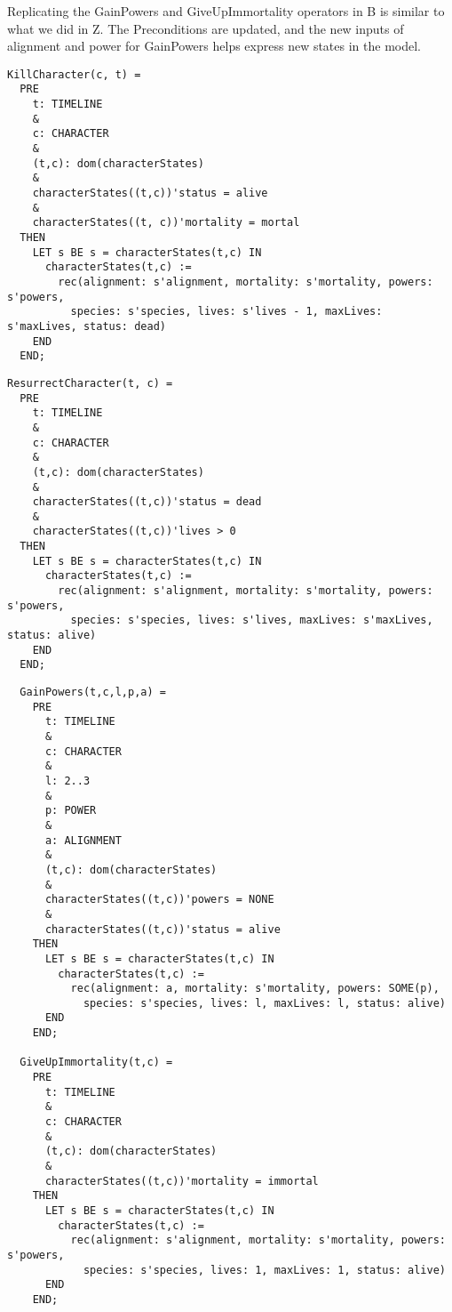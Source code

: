 \documentclass{article}
\begin{document}
\hspace{-0.64cm} Replicating the GainPowers and GiveUpImmortality operators in B is similar to what we did in Z. The Preconditions are updated, and the new inputs of alignment and power for GainPowers helps express new states in the model.
\begin{verbatim}
KillCharacter(c, t) =
  PRE
    t: TIMELINE 
    &
    c: CHARACTER
    &
    (t,c): dom(characterStates)
    &
    characterStates((t,c))'status = alive
    &
    characterStates((t, c))'mortality = mortal
  THEN
    LET s BE s = characterStates(t,c) IN 
      characterStates(t,c) := 
        rec(alignment: s'alignment, mortality: s'mortality, powers: s'powers, 
          species: s'species, lives: s'lives - 1, maxLives: s'maxLives, status: dead)
    END
  END;
\end{verbatim}
\begin{verbatim}
ResurrectCharacter(t, c) =
  PRE
    t: TIMELINE 
    &
    c: CHARACTER
    &
    (t,c): dom(characterStates)
    &
    characterStates((t,c))'status = dead
    &
    characterStates((t,c))'lives > 0
  THEN
    LET s BE s = characterStates(t,c) IN 
      characterStates(t,c) := 
        rec(alignment: s'alignment, mortality: s'mortality, powers: s'powers, 
          species: s'species, lives: s'lives, maxLives: s'maxLives, status: alive)
    END
  END;
\end{verbatim}
\pagebreak
\begin{verbatim}
  GainPowers(t,c,l,p,a) =
    PRE
      t: TIMELINE 
      &
      c: CHARACTER
      &
      l: 2..3
      &
      p: POWER
      &
      a: ALIGNMENT
      &
      (t,c): dom(characterStates)
      &
      characterStates((t,c))'powers = NONE
      & 
      characterStates((t,c))'status = alive
    THEN
      LET s BE s = characterStates(t,c) IN
        characterStates(t,c) := 
          rec(alignment: a, mortality: s'mortality, powers: SOME(p), 
            species: s'species, lives: l, maxLives: l, status: alive)
      END
    END;

  GiveUpImmortality(t,c) =
    PRE
      t: TIMELINE 
      &
      c: CHARACTER
      &
      (t,c): dom(characterStates)
      &
      characterStates((t,c))'mortality = immortal
    THEN
      LET s BE s = characterStates(t,c) IN
        characterStates(t,c) := 
          rec(alignment: s'alignment, mortality: s'mortality, powers: s'powers, 
            species: s'species, lives: 1, maxLives: 1, status: alive)
      END
    END;
\end{verbatim}
\end{document}
